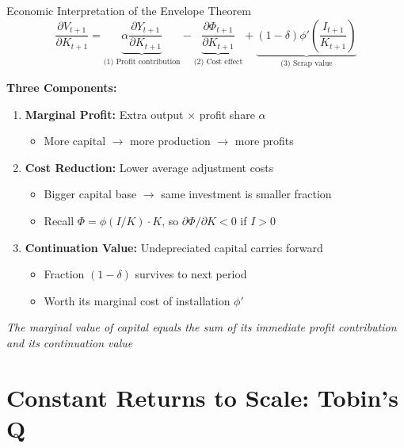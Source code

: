 \documentclass{beamer}
\begin{document}
\begin{frame}{Economic Interpretation of the Envelope Theorem}
    \begin{equation*}
        \frac{\partial V_{t+1}}{\partial K_{t+1}} = \underbrace{\alpha \frac{\partial Y_{t+1}}{\partial K_{t+1}}}_{\text{(1) Profit contribution}} - \underbrace{\frac{\partial \Phi_{t+1}}{\partial K_{t+1}}}_{\text{(2) Cost effect}} + \underbrace{(1-\delta) \phi'\left(\frac{I_{t+1}}{K_{t+1}}\right)}_{\text{(3) Scrap value}}
    \end{equation*}
    
    
    \textbf{Three Components:}
    \begin{enumerate}
        \item \textbf{Marginal Profit:} Extra output $\times$ profit share $\alpha$
        \begin{itemize}
            \item More capital $\rightarrow$ more production $\rightarrow$ more profits
        \end{itemize}
        
        \item \textbf{Cost Reduction:} Lower average adjustment costs
        \begin{itemize}
            \item Bigger capital base $\rightarrow$ same investment is smaller fraction
            \item Recall $\Phi = \phi(I/K) \cdot K$, so $\partial \Phi/\partial K < 0$ if $I > 0$
        \end{itemize}
        
        \item \textbf{Continuation Value:} Undepreciated capital carries forward
        \begin{itemize}
            \item Fraction $(1-\delta)$ survives to next period
            \item Worth its marginal cost of installation $\phi'$
        \end{itemize}
    \end{enumerate}
    
    \vspace{0.2cm}
    \textit{The marginal value of capital equals the sum of its immediate profit contribution and its continuation value}
\end{frame}

\section{Constant Returns to Scale: Tobin's Q}
\end{document}
